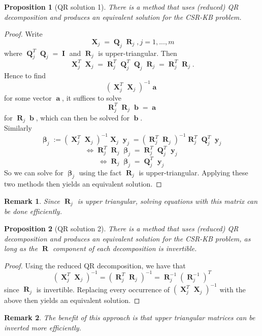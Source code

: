 \documentclass[12pt]{article}
\DeclareMathOperator{\bb}{\textbf{b}}
\DeclareMathOperator{\bX}{\textbf{X}}
\DeclareMathOperator{\by}{\textbf{y}}
\DeclareMathOperator{\bQ}{\textbf{Q}}
\DeclareMathOperator{\bI}{\textbf{I}}
\DeclareMathOperator{\bR}{\textbf{R}}
\DeclareMathOperator{\ba}{\textbf{a}}
\DeclareMathOperator{\bbeta}{\boldsymbol{\beta}}
\newtheorem{prop}{Proposition}
\newtheorem*{remark}{Remark}
\begin{document}
\begin{prop}[QR solution 1] There is a method that uses (reduced) QR decomposition and produces an equivalent solution for the CSR-KB problem.
\end{prop}
\begin{proof}
Write
$$\bX_j = \bQ_j \bR_j, j=1, ..., m$$
where $\bQ_j^T\bQ_j = \bI$ and $\bR_j$ is upper-triangular. Then
$$\bX_j^T \bX_j = \bR_j^T \bQ_j^T\bQ_j \bR_j = \bR_j^T\bR_j .$$
Hence to find 
$$(\bX_j^T \bX_j)^{-1} \ba$$
for some vector $\ba$, it suffices to solve
$$\bR_j^T \bR_j \bb = \ba$$
for $\bR_j \bb$, which can then be solved for $\bb$. \\
Similarly
$$\bbeta_j := (\bX_j^T \bX_j)^{-1} \bX_j \by_j = (\bR_j^T \bR_j)^{-1} \bR_j^T \bQ_j^T \by_j$$
$$\iff \bR_j^T \bR_j\bbeta_j = \bR_j^T \bQ_j^T \by_j$$
$$\iff \bR_j\bbeta_j = \bQ_j^T \by_j$$
So we can solve for $\bbeta_j$ using the fact $\bR_j$ is upper-triangular. Applying these two methods then yields an equivalent solution.
\end{proof}

\begin{remark}
Since $\bR_j$ is upper triangular, solving equations with this matrix can be done efficiently.
\end{remark}

\begin{prop}[QR solution 2] There is a method that uses (reduced) QR decomposition and produces an equivalent solution for the CSR-KB problem, as long as the $\bR$ component of each decomposition is invertible.
\end{prop}

\begin{proof}
Using the reduced QR decomposition, we have that 
$$(\bX_j^T \bX_j)^{-1} = (\bR_j^T \bR_j)^{-1} = \bR_j^{-1} (\bR_j^{-1})^T$$
since $\bR_j$ is invertible. Replacing every occurrence of $(\bX_j^T \bX_j)^{-1}$ with the above then yields an equivalent solution.
\end{proof}

\begin{remark}
The benefit of this approach is that upper triangular matrices can be inverted more efficiently.
\end{remark}
\end{document}
